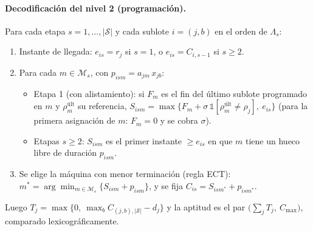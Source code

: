\documentclass[11pt,a4paper]{article}
\newcommand{\Sg}{\mathcal{S}}
\newcommand{\M}{\mathcal{M}}
\begin{document}
\paragraph{Decodificación del nivel 2 (programación).}
Para cada etapa $s = 1,\dots,|\Sg|$ y cada sublote $i=(j,b)$ en el orden de $\Lambda_s$:
\begin{enumerate}
  \item Instante de llegada: $e_{is} = r_j$ si $s=1$, o $e_{is} = C_{i,s-1}$ si $s\ge 2$.
  \item Para cada $m \in \M_s$, con $p_{ism} = a_{jm}\, x_{jb}$:
    \begin{itemize}
      \item Etapa 1 (con alistamiento): si $F_m$ es el fin del último sublote
            programado en $m$ y $\rho^{\text{últ}}_m$ su referencia,
            $S_{ism} = \max\{F_m + \sigma\,\mathbb{1}[\rho^{\text{últ}}_m \neq \rho_j],\ e_{is}\}$
            (para la primera asignación de $m$: $F_m = 0$ y se cobra $\sigma$).
      \item Etapas $s\ge 2$: $S_{ism}$ es el primer instante $\ge e_{is}$ en
            que $m$ tiene un hueco libre de duración $p_{ism}$.
    \end{itemize}
  \item Se elige la máquina con menor terminación (regla ECT):
        $m^* = \arg\min_{m\in\M_s} \{S_{ism} + p_{ism}\}$, y se fija
        $C_{is} = S_{ism^*} + p_{ism^*}$.
\end{enumerate}
Luego $T_j = \max\{0,\ \max_b C_{(j,b),|\Sg|} - d_j\}$ y la aptitud
es el par $\bigl(\sum_j T_j,\ C_{\max}\bigr)$, comparado lexicográficamente.
\end{document}
